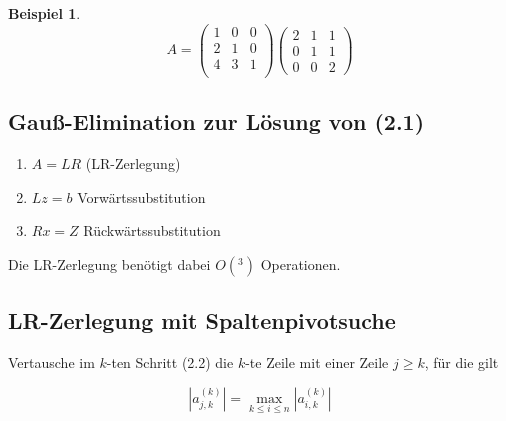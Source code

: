 \documentclass[a4paper,10pt]{article}
\newtheorem[L]{satz}{Satz}[section]
\newtheorem{bsp}{Beispiel}[section]
\newtheorem[S]{beweis}{Beweis}
\newtheorem[S]{beh}{Behauptung}
\begin{document}
\begin{bsp}
  \[
    A =
      \begin{pmatrix}
        1 & 0 & 0 \\
        2 & 1 & 0 \\
        4 & 3 & 1 \\
      \end{pmatrix}
      \begin{pmatrix}
        2 & 1 & 1 \\
        0 & 1 & 1 \\
        0 & 0 & 2
      \end{pmatrix}
  \]

\end{bsp}

\subsection{Gauß-Elimination zur Lösung von (2.1)} %

\begin{enumerate}
  \item $A = LR$ (LR-Zerlegung)
  \item $Lz = b$ Vorwärtssubstitution
  \item $Rx = Z$ Rückwärtssubstitution
\end{enumerate}

Die LR-Zerlegung benötigt dabei $O(^3)$ Operationen.

\subsection{LR-Zerlegung mit Spaltenpivotsuche}

Vertausche im $k$-ten Schritt (2.2) die $k$-te Zeile mit einer Zeile $j \geq k$, für die gilt

\[
  |a_{j,k}^{(k)} | = \max \limits_{k \leq i \leq n} | a_{i,k}^{(k)} |
\]
\end{document}
